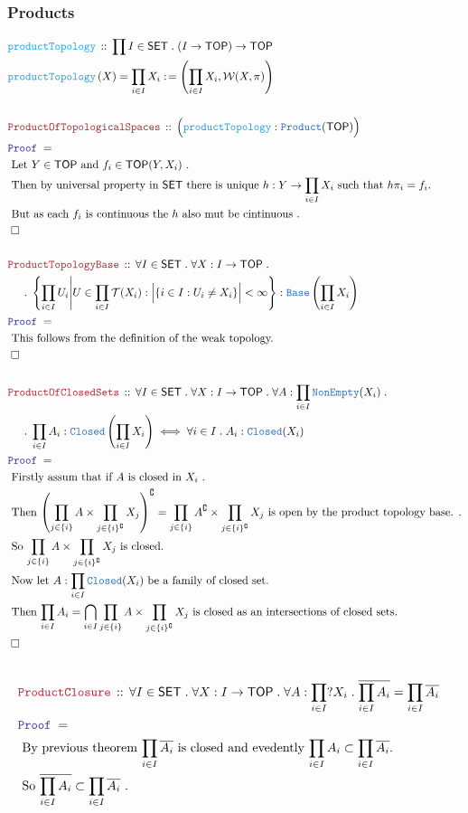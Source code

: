 \documentclass[12pt]{scrartcl}
\newcommand{\TYPE}[1]{\textcolor{NavyBlue}{\mathtt{#1}}}
\newcommand{\FUNC}[1]{\textcolor{Cerulean}{\mathtt{#1}}}
\newcommand{\LOGIC}[1]{\textcolor{Blue}{\mathtt{#1}}}
\newcommand{\THM}[1]{\textcolor{Maroon}{\mathtt{#1}}}
\renewcommand{\.}{\; . \;}
\newcommand{\de}{: \kern 0.1pc =}
\newcommand{\Act}[1]{\left( #1 \right)}
\newcommand{\Theorem}[2]{& \THM{#1} \, :: \, #2 \\ & \Proof = \\ }
\newcommand{\DeclareFunc}[2]{& \FUNC{#1} \, :: \, #2 \\}
\newcommand{\DefineNamedFunc}[4]{&  \FUNC{#1}\Act{#2} = #3 \de #4 \\}
\newcommand{\NewLine}{\\ & \kern 1pc}
\newcommand{\Page}[1]{ \begin{align*} #1 \end{align*}   }
\newcommand{\Explain}[1]{& \text{#1.} \\}
\renewcommand{\c}{\complement}
\newcommand{\QED}{\; \square}
\newcommand{\EndProof}{& \QED \\}
\newcommand{\Proof}{\LOGIC{Proof} \; }
\newcommand{\SET}{\mathsf{SET}}
\newcommand{\Closed}{\TYPE{Closed}}
\newcommand{\TOP}{\mathsf{TOP}}
\newcommand{\T}{\mathcal{T}}
\newcommand{\W}{\mathcal{W}}
\begin{document}
\subsubsection{Products}
\Page{
	\DeclareFunc{productTopology}
	{
		\prod I \in \SET \.
		(I \to \TOP) \to \TOP
	}
	\DefineNamedFunc{productTopology}{X}{\prod_{i \in I} X_i}
	{ \left( \prod_{i \in I} X_i, \W(X,\pi)  \right) }
	\\
	\Theorem{ProductOfTopologicalSpaces}
	{
		\Big( \FUNC{productTopology} : \TYPE{Product}(\TOP)  \Big) 
	}
	\Explain{ 
		Let $Y\in \TOP$ and $f_i \in \TOP(Y,X_i)$ }
	\Explain{
		Then by universal property in $\SET$ 
		there is unique $h : Y \to \prod_{i \in I} X_i$
		such that $ h \pi_i = f_i$}
	\Explain{
		But as each $f_i$ is continuous the $h$ also mut be cintinuous
	}
	\EndProof
	\\
	\Theorem{ProductTopologyBase}
	{
		\forall I \in \SET \.
		\forall X : I \to \TOP \. \NewLine \. 
		\left\{ \prod_{i \in I} U_i 
			\Bigg|  U \in \prod_{i \in I} \T(X_i) : 
			\Big|\{ i \in I : U_i \neq X_i\}\Big| <\infty    
		\right\} : \TYPE{Base}\left( \prod_{i \in I} X_i \right)
	}
	\Explain{
		This follows from the definition of the weak topology}
	\EndProof
	\\
	\Theorem{ProductOfClosedSets}
	{
		\forall I \in \SET \.
		\forall X : I \to \TOP \.
		\forall A : \prod_{i \in I} \TYPE{NonEmpty}(X_i) \. \NewLine \. 
		\prod_{i \in I} A_i : \TYPE{Closed}\left( \prod_{i \in I} X_i\right) \iff 
		\forall i \in I \.  A_i : \TYPE{Closed}(X_i) 
	}
	\Explain{
		Firstly assum that if  $A$ is closed in $X_i$
	}
	\Explain{
		Then 
		$\left(
				\prod_{j\in \{i\}} A \times \prod_{j \in \{i\}^\c} X_j
		 \right)^\c = 
				\prod_{j \in \{i\}} A^\c \times \prod_{j \in \{i\}^\c} X_j
		$
		is open by the product  topology base.
	}
	\Explain{
		So  
		$
				\prod_{j \in \{i\}} A \times \prod_{j \in \{i\}^\c} X_j
		$
		is closed}
	\Explain{
		Now let $A : \prod_{i \in I} \Closed(X_i)$ be a family of closed set}
	\Explain{
		Then $\prod_{i\in I} A_i = \bigcap_{i \in I} \prod_{j \in \{i\}} A \times \prod_{j \in \{i\}^\c} X_j$
		is closed as an intersections of closed sets}
	\EndProof
}\Page{
	\\
	\Theorem{ProductClosure}
	{
		\forall I \in \SET \.
		\forall X : I \to \TOP \.
		\forall A : \prod_{i \in I} ?X_i \.
		\overline{\prod_{i\in I} A_i} = \prod_{i \in I} \overline{A_i}
	}
	\Explain{
		By previous theorem $ \prod_{i \in I} \overline{A_i}$ is closed
		and evedently $\prod_{i\in I} A_i \subset  \prod_{i \in I} \overline{A_i}$}
	\Explain{
		So $\overline{\prod_{i\in I} A_i} \subset \prod_{i \in I} \overline{A_i}$
}}
\end{document}
